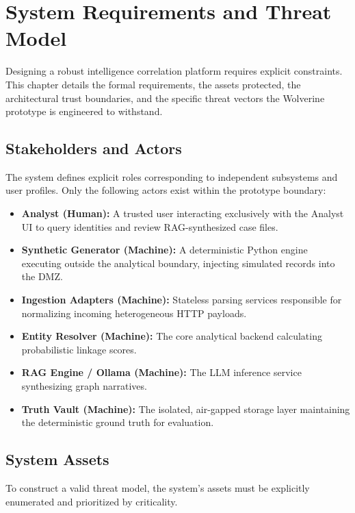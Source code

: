 \chapter{System Requirements and Threat Model}
\label{ch:requirements-threat-model}

Designing a robust intelligence correlation platform requires explicit constraints. This chapter details the formal requirements, the assets protected, the architectural trust boundaries, and the specific threat vectors the Wolverine prototype is engineered to withstand.

\section{Stakeholders and Actors}
\label{sec:requirements-actors}
The system defines explicit roles corresponding to independent subsystems and user profiles. Only the following actors exist within the prototype boundary:

\begin{itemize}
    \item \textbf{Analyst (Human):} A trusted user interacting exclusively with the Analyst UI to query identities and review RAG-synthesized case files.
    \item \textbf{Synthetic Generator (Machine):} A deterministic Python engine executing outside the analytical boundary, injecting simulated records into the DMZ.
    \item \textbf{Ingestion Adapters (Machine):} Stateless parsing services responsible for normalizing incoming heterogeneous HTTP payloads.
    \item \textbf{Entity Resolver (Machine):} The core analytical backend calculating probabilistic linkage scores.
    \item \textbf{RAG Engine / Ollama (Machine):} The LLM inference service synthesizing graph narratives.
    \item \textbf{Truth Vault (Machine):} The isolated, air-gapped storage layer maintaining the deterministic ground truth for evaluation.
\end{itemize}

\section{System Assets}
\label{sec:requirements-assets}
To construct a valid threat model, the system's assets must be explicitly enumerated and prioritized by criticality.

